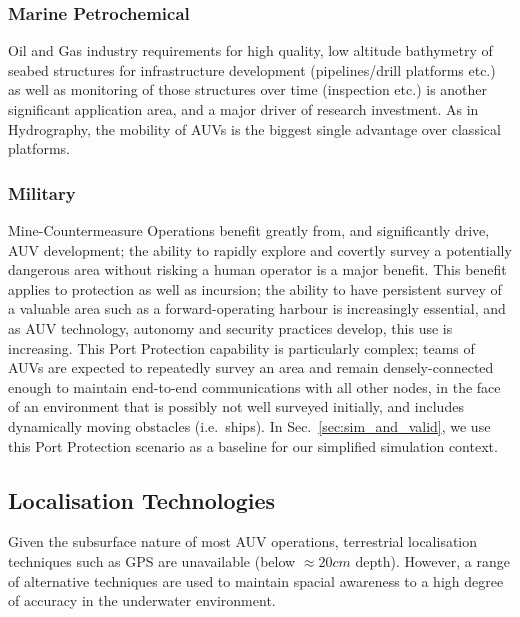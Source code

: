\documentclass[conference,compsoc,letterpaper]{IEEEtran}
\begin{document}
\subsubsection{Marine Petrochemical}
Oil and Gas industry requirements for high quality, low altitude bathymetry of seabed structures for infrastructure development (pipelines/drill platforms etc.) as well as monitoring of those structures over time (inspection etc.) is another significant application area, and a major driver of research investment.
As in Hydrography, the mobility of AUVs is the biggest single advantage over classical platforms\cite{Morr2003}.

\subsubsection{Military}
Mine-Countermeasure Operations benefit greatly from, and significantly drive, AUV development; the ability to rapidly explore and covertly survey a potentially dangerous area without risking a human operator is a major benefit.
This benefit applies to protection as well as incursion; the ability to have persistent survey of a valuable area such as a forward-operating harbour is increasingly essential, and as AUV technology, autonomy and security practices develop, this use is increasing.
This Port Protection capability is particularly complex;  teams of AUVs are expected to repeatedly survey an area and remain densely-connected enough to maintain end-to-end communications with all other nodes, in the face of an environment that is possibly not well surveyed initially, and includes dynamically moving obstacles (i.e.\ ships).
In Sec.~\ref{sec:sim_and_valid}, we use this Port Protection scenario as a baseline for our simplified simulation context.


\subsection{Localisation Technologies}

Given the subsurface nature of most AUV operations, terrestrial localisation techniques such as GPS are unavailable (below $\approx 20cm$ depth). 
However, a range of alternative techniques are used to maintain spacial awareness to a high degree of accuracy in the underwater environment.
\end{document}
